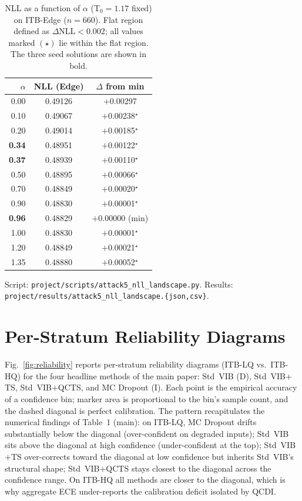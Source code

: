 \documentclass{bmvc2k}
\begin{document}
\begin{table}[h]
\centering
\caption{NLL as a function of $\alpha$ (T$_0{=}1.17$ fixed) on ITB-Edge ($n{=}660$). Flat region defined as $\Delta\text{NLL}{<}0.002$; all values marked $(\star)$ lie within the flat region. The three seed solutions are shown in bold.}
\label{tab:nll_landscape}
\footnotesize
\begin{tabular}{rcc}
\toprule
$\alpha$ & NLL (Edge) & $\Delta$ from min \\
\midrule
0.00 & 0.49126 & $+$0.00297 \\
0.10 & 0.49067 & $+$0.00238$^\star$ \\
0.20 & 0.49014 & $+$0.00185$^\star$ \\
\textbf{0.34} & 0.48951 & $+$0.00122$^\star$ \\
\textbf{0.37} & 0.48939 & $+$0.00110$^\star$ \\
0.50 & 0.48895 & $+$0.00066$^\star$ \\
0.70 & 0.48849 & $+$0.00020$^\star$ \\
0.90 & 0.48830 & $+$0.00001$^\star$ \\
\textbf{0.96} & 0.48829 & $+$0.00000 (min) \\
1.00 & 0.48830 & $+$0.00001$^\star$ \\
1.20 & 0.48849 & $+$0.00021$^\star$ \\
1.35 & 0.48880 & $+$0.00052$^\star$ \\
\bottomrule
\end{tabular}
\end{table}

Script: \texttt{project/scripts/attack5\_nll\_landscape.py}.
Results: \texttt{project/results/attack5\_nll\_landscape.\{json,csv\}}.

\section{Per-Stratum Reliability Diagrams}
\label{app:reliability}

Fig.~\ref{fig:reliability} reports per-stratum reliability diagrams (ITB-LQ vs.\ ITB-HQ) for the four headline methods of the main paper: Std~VIB (D), Std~VIB$+$TS, Std~VIB$+$QCTS, and MC Dropout (I). Each point is the empirical accuracy of a confidence bin; marker area is proportional to the bin's sample count, and the dashed diagonal is perfect calibration. The pattern recapitulates the numerical findings of Table~1 (main): on ITB-LQ, MC Dropout drifts substantially below the diagonal (over-confident on degraded inputs); Std~VIB sits above the diagonal at high confidence (under-confident at the top); Std~VIB$+$TS over-corrects toward the diagonal at low confidence but inherits Std~VIB's structural shape; Std~VIB$+$QCTS stays closest to the diagonal across the confidence range. On ITB-HQ all methods are closer to the diagonal, which is why aggregate ECE under-reports the calibration deficit isolated by QCDI.
\end{document}
